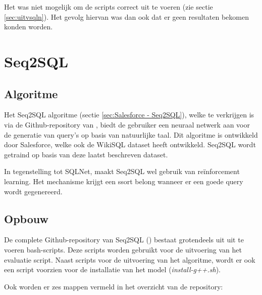 Het was niet mogelijk om de scripts correct uit te voeren (zie sectie \ref{sec:uitvsqln}). Het gevolg hiervan was dan ook dat er geen resultaten bekomen konden worden. 

\section{Seq2SQL}

\subsection{Algoritme}

Het Seq2SQL algoritme (sectie \ref{sec:Salesforce - Seq2SQL}), welke te verkrijgen is via de Github-repository van \textcite{seq2sql}, biedt de gebruiker een neuraal netwerk aan voor de generatie van query's op basis van natuurlijke taal. Dit algoritme is ontwikkeld door Salesforce, welke ook de WikiSQL dataset heeft ontwikkeld. Seq2SQL wordt getraind op basis van deze laatst beschreven dataset.

In tegenstelling tot SQLNet, maakt Seq2SQL wel gebruik van reïnforcement learning. Het mechanisme krijgt een ssort belong wanneer er een goede query wordt gegenereerd. 

\subsection{Opbouw}

De complete Github-repository van Seq2SQL (\textcite{seq2sql}) bestaat grotendeels uit uit te voeren bash-scripts. Deze scripts worden gebruikt voor de uitvoering van het evaluatie script. Naast scripts voor de uitvoering van het algoritme, wordt er ook een script voorzien voor de installatie van het model (\textit{install-g++.sh}).

Ook worden er zes mappen vermeld in het overzicht van de repository:


